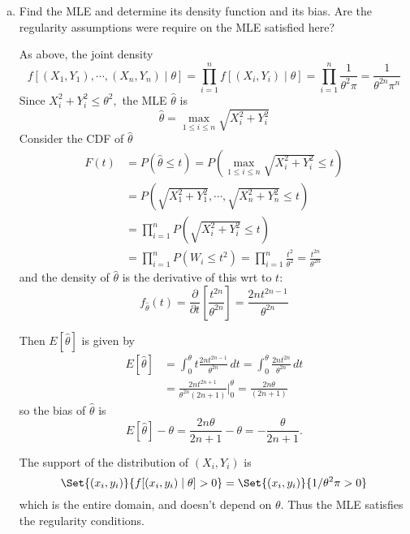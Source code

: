\documentclass{article}
\begin{document}
\begin{enumerate}
\begin{enumerate}[(a)]
			\item Find the MLE and determine its density function and its bias. Are the regularity assumptions were require on the MLE satisfied here?
				\begin{soln}
					As above, the joint density \[f\left[ (X_1, Y_1), \cdots, (X_n, Y_n)\mid \theta \right] = \prod_{i=1}^{n}f\left[ (X_i, Y_i)\mid \theta \right]=\prod_{i=1}^{n}\frac{1}{\theta^2\pi} = \frac{1}{\theta^{2n}\pi^{n}}\] Since $X_i^2+Y_i^2\le \theta^2,$ the MLE $\hat{\theta}$ is \[\hat{\theta}=\max_{1\le i\le n} \sqrt{X_i^2+Y_i^2}\] Consider the CDF of $\hat{\theta}$ 
					\begin{align*}
						F(t)&=P(\hat{\theta}\le t) = P\left( \max_{1\le i\le n} \sqrt{X_i^2+Y_i^2} \le t\right) \\
						&= P\left( \sqrt{X_1^2+Y_1^2},\cdots, \displaystyle \sqrt{X_n^2+Y_n^2}\le t \right) \\
						&= \prod_{i=1}^{n}P\left(\sqrt{X_i^2+Y_i^2}\le t\right) \\
						&= \prod_{i=1}^{n} P(W_i\le t^2) = \prod_{i=1}^{n} \frac{t^2}{\theta^2} = \frac{t^{2n}}{\theta^{2n}} 
					\end{align*} and the density of $\hat{\theta}$ is the derivative of this wrt to $t:$
					\[f_{\hat{\theta}}(t) = \frac{\partial}{\partial t}\left[ \frac{t^{2n}}{\theta^{2n}} \right]=\frac{2n t^{2n-1}}{\theta^{2n}}\] 

					Then $E[\hat{\theta}]$ is given by
					\begin{align*}
						E[ \hat{\theta}] &= \int_0^\theta t\frac{2nt^{2n-1}}{\theta^{2n}}\, dt = \int_0^\theta \frac{2nt^{2n}}{\theta^{2n}}\, dt \\
						&= \frac{2nt^{2n+1}}{\theta^{2n}(2n+1)}\bigg\vert_0^\theta =\frac{2n\theta}{(2n+1)} 
					\end{align*} so the bias of $\hat{\theta}$ is \[E[\hat{\theta}]-\theta=\frac{2n\theta}{2n+1}-\theta = -\frac{\theta}{2n+1}.\]

					The support of the distribution of $(X_i, Y_i)$ is \[\Set{(x_i, y_i)}{f[(x_i, y_i)\mid\theta]>0}=\Set{(x_i, y_i)}{1/\theta^2\pi>0}\] which is the entire domain, and doesn't depend on $\theta.$ Thus the MLE satisfies the regularity conditions.
					
				\end{soln}


\end{enumerate}
\end{enumerate}
\end{document}
